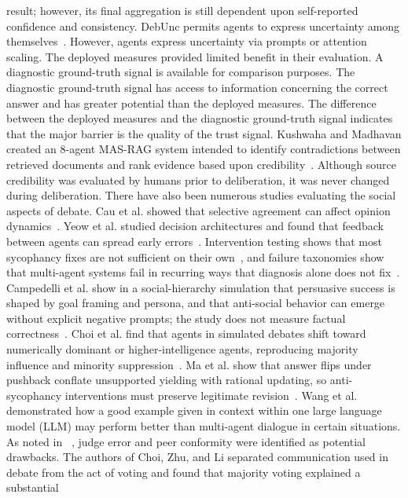 result; however, its final aggregation is still dependent upon self-reported
confidence and consistency. DebUnc permits agents to express uncertainty among themselves~\cite{yoffe-etal-2025-debunc}. However, agents express uncertainty via prompts or attention scaling. The deployed measures provided limited benefit in their evaluation. A diagnostic ground-truth signal is available for comparison purposes. The diagnostic ground-truth signal has access to information concerning the correct answer and has greater potential than the deployed measures. The difference between the deployed measures and the diagnostic ground-truth signal indicates that the major barrier is the quality of the trust signal. Kushwaha and Madhavan created an 8-agent MAS-RAG system intended to identify contradictions between retrieved documents and rank evidence based upon credibility~\cite{kushwaha2026agentbased}. Although source credibility was evaluated by humans prior to deliberation, it was never changed during deliberation.
There have also been numerous studies evaluating the social aspects of
debate. Cau et al. showed that selective agreement can affect opinion
dynamics~\cite{cau2025selective}. Yeow et al.
studied decision architectures and found that feedback between agents can
spread early errors~\cite{yeow2025reliable}. Intervention testing shows that
most sycophancy fixes are not sufficient on their own~\cite{wynn2025talk}, and
failure taxonomies show that multi-agent systems fail in recurring ways that
diagnosis alone does not fix~\cite{cemri2025why}. Campedelli et al. show in a
social-hierarchy simulation that persuasive success is shaped by goal framing
and persona, and that anti-social behavior can emerge without explicit negative
prompts; the study does not measure factual correctness~\cite{campedelli2025breakfree}. Choi et al. find that agents in simulated
debates shift toward numerically dominant or higher-intelligence agents,
reproducing majority influence and minority suppression~\cite{choi2025group}.
Ma et al. show that answer flips under pushback conflate unsupported yielding
with rational updating, so anti-sycophancy interventions must preserve
legitimate revision~\cite{ma2026sycophancy}. Wang et al. demonstrated how a
good example given in context within one large language model (LLM) may
perform better than multi-agent dialogue in certain situations. As noted in
~\cite{wang-etal-2024-rethinking-bounds}, judge error and peer conformity
were identified as potential drawbacks.
The authors of Choi, Zhu, and Li separated communication used in debate from
the act of voting and found that majority voting explained a substantial
